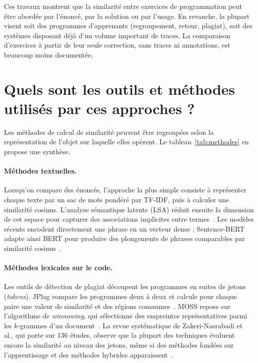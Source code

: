 Ces travaux montrent que la similarité entre exercices de programmation peut être abordée par l'énoncé, par la solution ou par l'usage. En revanche, la plupart visent soit des programmes d'apprenants (regroupement, retour, plagiat), soit des systèmes disposant déjà d'un volume important de traces. La comparaison d'exercices à partir de leur seule correction, sans traces ni annotations, est beaucoup moins documentée.

\section{Quels sont les outils et méthodes utilisés par ces approches ?}
\label{sec:methodes}

Les méthodes de calcul de similarité peuvent être regroupées selon la représentation de l'objet sur laquelle elles opèrent. Le tableau~\ref{tab:methodes} en propose une synthèse.

\paragraph{Méthodes textuelles.} Lorsqu'on compare des énoncés, l'approche la plus simple consiste à représenter chaque texte par un sac de mots pondéré par TF-IDF, puis à calculer une similarité cosinus. L'analyse sémantique latente (LSA) réduit ensuite la dimension de cet espace pour capturer des associations implicites entre termes~\cite{deerwester1990lsa}. Les modèles récents encodent directement une phrase en un vecteur dense ; Sentence-BERT adapte ainsi BERT pour produire des plongements de phrases comparables par similarité cosinus~\cite{reimers2019sbert}.

\paragraph{Méthodes lexicales sur le code.} Les outils de détection de plagiat découpent les programmes en suites de jetons (\emph{tokens}). JPlag compare les programmes deux à deux et calcule pour chaque paire une valeur de similarité et des régions communes~\cite{prechelt2002jplag}. MOSS repose sur l'algorithme de \emph{winnowing}, qui sélectionne des empreintes représentatives parmi les $k$-grammes d'un document~\cite{schleimer2003winnowing}. La revue systématique de Zakeri-Nasrabadi et al., qui porte sur 136 études, observe que la plupart des techniques évaluent encore la similarité au niveau des jetons, même si des méthodes fondées sur l'apprentissage et des méthodes hybrides apparaissent~\cite{zakeri2023slr}.

